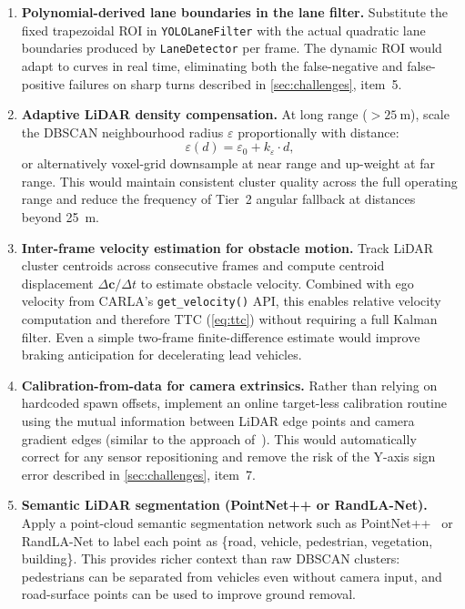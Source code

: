 \documentclass[12pt,a4paper]{article}
\begin{document}
\begin{enumerate}[label=\textbf{\arabic{enumi}.}, leftmargin=2.5em,
                  itemsep=6pt]
  \item \textbf{Polynomial-derived lane boundaries in the lane filter.}
    Substitute the fixed trapezoidal ROI in \texttt{YOLOLaneFilter} with
    the actual quadratic lane boundaries produced by \texttt{LaneDetector}
    per frame.  The dynamic ROI would adapt to curves in real time, eliminating
    both the false-negative and false-positive failures on sharp turns described
    in \cref{sec:challenges}, item~5.

  \item \textbf{Adaptive LiDAR density compensation.}
    At long range ($> \SI{25}{\metre}$), scale the DBSCAN neighbourhood radius
    $\varepsilon$ proportionally with distance:
    \begin{equation}
      \varepsilon(d) = \varepsilon_0 + k_\varepsilon \cdot d,
      \label{eq:adaptive_eps}
    \end{equation}
    or alternatively voxel-grid downsample at near range and up-weight at far
    range.  This would maintain consistent cluster quality across the full
    operating range and reduce the frequency of Tier~2 angular fallback at
    distances beyond \SI{25}{\metre}.

  \item \textbf{Inter-frame velocity estimation for obstacle motion.}
    Track LiDAR cluster centroids across consecutive frames and compute
    centroid displacement $\Delta\mathbf{c} / \Delta t$ to estimate
    obstacle velocity.  Combined with ego velocity from CARLA's
    \texttt{get\_velocity()} API, this enables relative velocity computation
    and therefore TTC (\cref{eq:ttc}) without requiring a full Kalman
    filter.  Even a simple two-frame finite-difference estimate would improve
    braking anticipation for decelerating lead vehicles.

  \item \textbf{Calibration-from-data for camera extrinsics.}
    Rather than relying on hardcoded spawn offsets, implement an online
    target-less calibration routine using the mutual information between
    LiDAR edge points and camera gradient edges
    (similar to the approach of~\cite{geiger2012kitti}).  This would
    automatically correct for any sensor repositioning and remove the
    risk of the Y-axis sign error described in \cref{sec:challenges},
    item~7.

  \item \textbf{Semantic LiDAR segmentation (PointNet++ or RandLA-Net).}
    Apply a point-cloud semantic segmentation network such as
    PointNet++~\cite{qi2017pointnet} or RandLA-Net to label each point
    as \{road, vehicle, pedestrian, vegetation, building\}.  This provides
    richer context than raw DBSCAN clusters: pedestrians can be separated
    from vehicles even without camera input, and road-surface points can be
    used to improve ground removal.


\end{enumerate}
\end{document}
